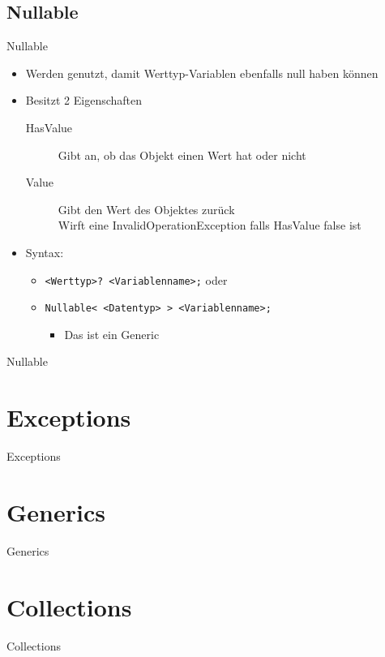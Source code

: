 \subsection{Nullable}
\begin{frame}{Nullable}
	\begin{itemize}
		\item Werden genutzt, damit Werttyp-Variablen ebenfalls \alert{null} haben können
		\item Besitzt 2 Eigenschaften
		\begin{description}
			\item[HasValue] Gibt an, ob das Objekt einen Wert hat oder nicht
			\item[Value] Gibt den Wert des Objektes zurück\\ Wirft eine InvalidOperationException falls HasValue false ist 
		\end{description}
		\item Syntax:
		\begin{itemize}
			\item \alert{\texttt{<Werttyp>? <Variablenname>;}} oder
			\item \alert{\texttt{Nullable< <Datentyp> > <Variablenname>;}}
			\begin{itemize}
				\item Das ist ein Generic
			\end{itemize}
		\end{itemize}
	\end{itemize}
\end{frame}

\begin{frame}{Nullable}
		
\end{frame}

\section{Exceptions}
\begin{frame}{Exceptions}

\end{frame}

\section{Generics}
\begin{frame}{Generics}

\end{frame}

\section{Collections}
\begin{frame}{Collections}

\end{frame}


